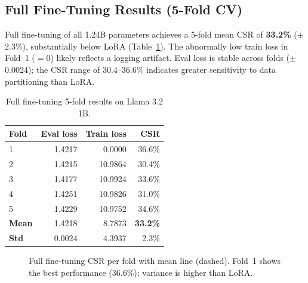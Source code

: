\documentclass[10pt]{article}
\begin{document}
\subsection{Full Fine-Tuning Results (5-Fold CV)}

Full fine-tuning of all 1.24B parameters achieves a 5-fold mean CSR of
\textbf{33.2\%} ($\pm$2.3\%), substantially below LoRA
(Table~\ref{tab:ft_folds}). The abnormally low train loss in Fold~1
($=0$) likely reflects a logging artifact. Eval loss is stable across
folds ($\pm$0.0024); the CSR range of 30.4--36.6\% indicates greater
sensitivity to data partitioning than LoRA.

\begin{table}[H]
\centering
\caption{Full fine-tuning 5-fold results on Llama 3.2 1B.}
\label{tab:ft_folds}
\small
\begin{tabular}{lrrr}
\toprule
\textbf{Fold} & \textbf{Eval loss} & \textbf{Train loss} & \textbf{CSR} \\
\midrule
1 & 1.4217 & \phantom{0}0.0000 & 36.6\% \\
2 & 1.4215 & 10.9864           & 30.4\% \\
3 & 1.4177 & 10.9924           & 33.6\% \\
4 & 1.4251 & 10.9826           & 31.0\% \\
5 & 1.4229 & 10.9752           & 34.6\% \\
\midrule
\textbf{Mean} & 1.4218 & 8.7873 & \textbf{33.2\%} \\
\textbf{Std}  & 0.0024 & 4.3937 & 2.3\% \\
\bottomrule
\end{tabular}
\end{table}

\begin{figure}[htbp]
\centering
{}
\caption{Full fine-tuning CSR per fold with mean line (dashed). Fold~1
shows the best performance (36.6\%); variance is higher than LoRA.}
\label{fig:ft_folds}
\end{figure}
\end{document}
